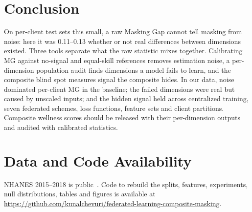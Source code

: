 \section{Conclusion}

On per-client test sets this small, a raw Masking Gap cannot tell masking from noise: here it was 0.11--0.13 whether or not real differences between dimensions existed. Three tools separate what the raw statistic mixes together. Calibrating MG against no-signal and equal-skill references removes estimation noise, a per-dimension population audit finds dimensions a model fails to learn, and the composite blind spot measures signal the composite hides. In our data, noise dominated per-client MG in the baseline; the failed dimensions were real but caused by unscaled inputs; and the hidden signal held across centralized training, seven federated schemes, loss functions, feature sets and client partitions. Composite wellness scores should be released with their per-dimension outputs and audited with calibrated statistics.

\section*{Data and Code Availability}
NHANES 2015--2018 is public~\cite{nhanes2015}. Code to rebuild the splits, features, experiments, null distributions, tables and figures is available at \url{https://github.com/kunalchevuri/federated-learning-composite-masking}.
